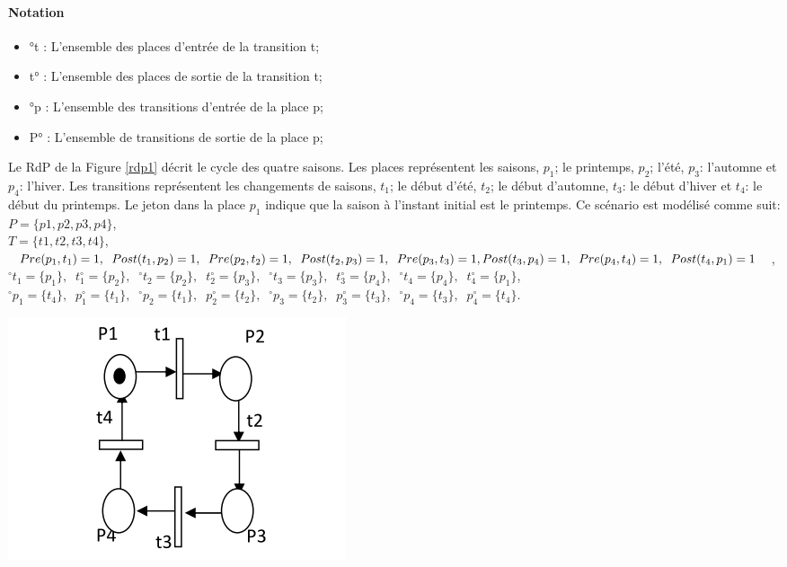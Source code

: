 \begin{definition}[Formelle]
\paragraph{Notation}
\begin{itemize}
	\item °t : L'ensemble des places d'entrée de la transition t;
	\item t° : L'ensemble des places de sortie  de la transition t;
	\item °p : L'ensemble des transitions  d'entrée de la place p; 
	\item P° : L'ensemble de transitions de sortie de la place p;  
\end{itemize}
Le RdP de la Figure \ref{rdp1} décrit le cycle des quatre saisons. Les places représentent les saisons,   $p_1$; le printemps, $p_2$; l'été,   $p_3$: l'automne et $p_4$: l'hiver. Les transitions représentent les changements de saisons, $t_1$; le début d'été, $t_2$; le début d'automne, $t_3$: le début d'hiver et $t_4$: le début du printemps. Le jeton dans la place $p_1$ indique que la saison à l'instant initial est le printemps. Ce scénario est modélisé comme suit:\\ 
$P= \{p 1 , p 2 , p 3 , p 4 \}$,\\ 
$T= \{t 1 , t 2 , t 3 , t 4 \}$, \\  
$Pre(p_1 ,t_1 )=1,\;\; 
Post(t_1 ,p_2 )=1,\;\; 
Pre(p_2 ,t_2 )=1,\;\; 
Post(t_2 ,p_3 )=1,\;\; 
Pre(p_3 ,t_3 )=1,\\ 
Post(t_3 ,p_4 )=1,\;\; 
Pre(p_4 ,t_4 )=1,\;\; 
Post(t_4 ,p_1 )=1$ ,  \\
$^{\circ}t_1=\{p_1 \},\;\; 
t_1^{\circ} =\{p_2 \},\;\; 
^{\circ}t_2=\{p_2 \},\;\; 
t_2^{\circ} =\{p_3 \},\;\; 
^{\circ}t_3=\{p_3 \},\;\; 
t_3^{\circ}=\{p_4 \},\;\; 
^{\circ}t_4=\{p_4 \},\;\; 
t_4^{\circ} =\{p_1 \}$,\\
$^{\circ}p_1= \{t_4 \},\;\; 
p_1^{\circ} = \{t_1 \},\;\; 
^{\circ}p_2= \{t_1 \},\;\; 
p_2^{\circ} =\{t_2 \},\;\; 
^{\circ}p_3= \{t_2 \},\;\; 
p_3^{\circ} = \{t_3 \},\;\; 
^{\circ}p_4= \{t_3 \},\;\; 
p_4^{\circ} = \{t_4 \}$.
 \begin{center}
	\includegraphics[scale=0.5]{img/rdp1.PNG}
	 \label{rdp1}
 \end{center}
\end{definition}

